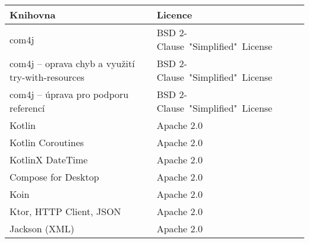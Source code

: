 \begin{table}[hbt!]
    \centering
    \captionsetup{justification=centering}
    \begin{tabular}{|l|l|l|}
        \hline
        \textbf{Knihovna}                                 & \textbf{Licence}                                                                                                          \\ \hline
        com4j                                             & BSD 2-Clause\ "Simplified"\ License\tablefootnote{\url{https://github.com/kohsuke/com4j/blob/master/LICENSE.txt}}         \\ \hline
        com4j -- oprava chyb a využití try-with-resources & BSD 2-Clause\ "Simplified"\ License\tablefootnote{\url{https://github.com/archiecobbs/com4j/blob/master/LICENSE.txt}}     \\ \hline
        com4j -- úprava pro podporu referencí             & BSD 2-Clause\ "Simplified"\ License\tablefootnote{\url{https://github.com/jasperkrijgsman/com4j/blob/master/LICENSE.txt}} \\ \hline
        Kotlin                                            & Apache 2.0\tablefootnote{\url{https://github.com/JetBrains/kotlin/blob/master/license/README.md}}                         \\ \hline
        Kotlin Coroutines                                 & Apache 2.0\tablefootnote{\url{https://github.com/Kotlin/kotlinx.coroutines/blob/master/LICENSE.txt}}                      \\ \hline
        KotlinX DateTime                                  & Apache 2.0\tablefootnote{\url{https://github.com/Kotlin/kotlinx-datetime/blob/master/LICENSE.txt}}                        \\ \hline
        Compose for Desktop                               & Apache 2.0\tablefootnote{\url{https://github.com/JetBrains/compose-jb/blob/master/LICENSE.txt}}                           \\ \hline
        Koin                                              & Apache 2.0\tablefootnote{\url{https://github.com/InsertKoinIO/koin/blob/master/LICENSE}}                                  \\ \hline
        Ktor, HTTP Client, JSON                           & Apache 2.0\tablefootnote{\url{https://github.com/ktorio/ktor/blob/main/LICENSE}}                                          \\ \hline
        Jackson (XML)                                     & Apache 2.0\tablefootnote{\url{https://github.com/FasterXML/jackson-dataformat-xml/blob/master/LICENSE}}                   \\ \hline

\end{tabular}
\end{table}
